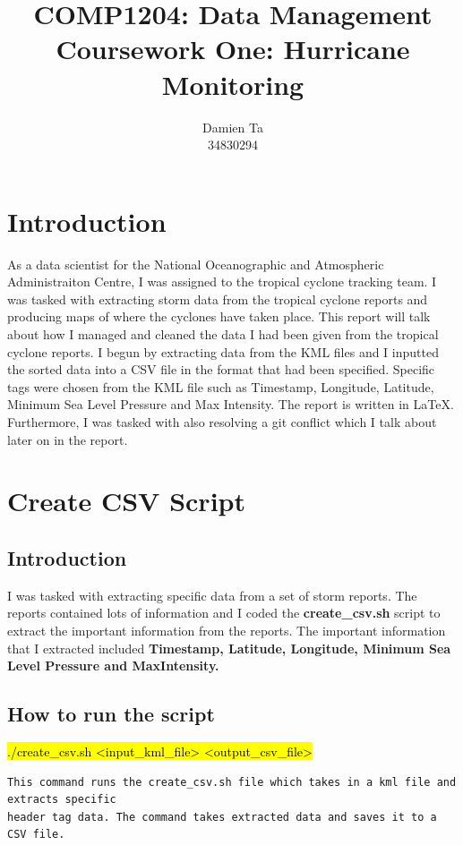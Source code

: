 \documentclass[]{article}
\title{COMP1204: Data Management \\ Coursework One: Hurricane Monitoring }
\author{Damien Ta \\ 34830294}
\begin{document}
\maketitle

\section{Introduction}
As a data scientist for the National Oceanographic and Atmospheric Administraiton Centre, I was assigned to the tropical cyclone
tracking team. I was tasked with extracting storm data from the tropical cyclone reports and producing maps of where the cyclones
have taken place. 
\newline
\newline
This report will talk about how I managed and cleaned the data I had been given from the tropical cyclone reports. I begun by extracting data from the
KML files and I inputted the sorted data into a CSV file in the format that had been specified. Specific tags
were chosen from the KML file such as Timestamp, Longitude, Latitude, Minimum Sea Level Pressure and Max Intensity.
The report is written in LaTeX. Furthermore, I was tasked with also resolving a git conflict which I
talk about later on in the report.

\clearpage

\section{Create CSV Script}
\subsection{Introduction}
I was tasked with extracting specific data from a set of storm reports.
The reports contained lots of information and I coded the \textbf{create\_csv.sh}
script to extract the important information from the reports.
The important information that I extracted included \textbf{Timestamp, Latitude,
Longitude, Minimum Sea Level Pressure and MaxIntensity.}

\subsection{How to run the script}
\begin{tcolorbox}[colback=white, colframe=black, boxrule=1pt, 
    title=Script to run create\_csv.sh, width=6.7in, fonttitle=\bfseries, listing only, listing options={language=sh, basicstyle=\ttfamily}]
\hl{./create\_csv.sh <input\_kml\_file> <output\_csv\_file>}
\begin{verbatim}
This command runs the create_csv.sh file which takes in a kml file and extracts specific
header tag data. The command takes extracted data and saves it to a CSV file.
\end{verbatim}
\end{tcolorbox}
\end{document}
